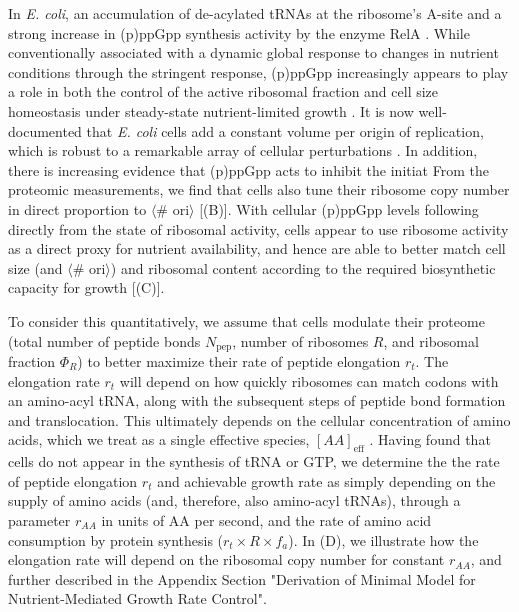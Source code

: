 In \textit{E. coli}, an accumulation of de-acylated tRNAs at the ribosome's
A-site and a strong increase in (p)ppGpp synthesis activity by the enzyme RelA
\citep{hauryliuk2015}. While conventionally associated with a dynamic global
response to changes in nutrient conditions through the stringent response,
(p)ppGpp increasingly appears to play a role in both the control of the active
ribosomal fraction and cell size homeostasis under steady-state nutrient-limited
growth \citep{dai2016, zhu2019, Buke2020, vadia2017, parker2020}. It is now
well-documented that \textit{E. coli} cells add a constant volume per origin of
replication, which is robust to a remarkable array of cellular perturbations
\citep{si2017}. In addition, there is increasing evidence that (p)ppGpp acts to
inhibit the initiat From the proteomic measurements, we find that
cells also tune their ribosome copy number in direct proportion to $\langle$\#
ori$\rangle$ [(B)]. With cellular (p)ppGpp levels
following directly from the state of ribosomal activity,
cells appear to use ribosome activity as a direct proxy for nutrient
availability, and hence are able to better match cell size (and $\langle$\#
ori$\rangle$) and ribosomal content according to the required biosynthetic
capacity for growth [(C)].

To consider this quantitatively, we assume that cells modulate their proteome
(total number of peptide bonds $N_\text{pep}$, number of ribosomes $R$, and
ribosomal fraction $\Phi_R$) to better maximize their rate of peptide elongation
$r_t$. The elongation rate $r_t$ will depend on how quickly ribosomes can match
codons with an amino-acyl tRNA, along with the subsequent steps of peptide bond
formation and translocation. This ultimately depends on the cellular
concentration of amino acids, which we treat as a single effective species,
$[AA]_\text{eff}$ \citep{bosdriesz2015}. Having found that cells do not appear
in the synthesis of tRNA or GTP, we determine the the rate of peptide elongation
$r_t$ and achievable growth rate as simply depending on the supply of amino
acids (and, therefore, also amino-acyl tRNAs), through a parameter $r_{AA}$ in
units of AA per second, and the rate of amino acid consumption by protein
synthesis ($r_t \times R \times f_a$). In (D), we
illustrate how the elongation rate will depend on the ribosomal copy number for
constant $r_{AA}$, and further described in the Appendix Section
"Derivation of Minimal Model for Nutrient-Mediated Growth Rate Control".

